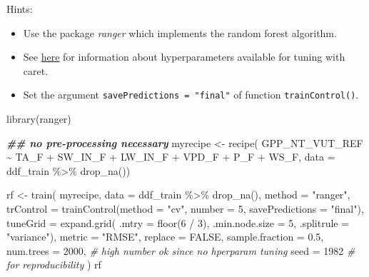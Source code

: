 \documentclass[
]{book}
\newenvironment{Shaded}{\begin{snugshade}}{\end{snugshade}}
\newcommand{\AttributeTok}[1]{\textcolor[rgb]{0.77,0.63,0.00}{#1}}
\newcommand{\CommentTok}[1]{\textcolor[rgb]{0.56,0.35,0.01}{\textit{#1}}}
\newcommand{\ConstantTok}[1]{\textcolor[rgb]{0.00,0.00,0.00}{#1}}
\newcommand{\DecValTok}[1]{\textcolor[rgb]{0.00,0.00,0.81}{#1}}
\newcommand{\DocumentationTok}[1]{\textcolor[rgb]{0.56,0.35,0.01}{\textbf{\textit{#1}}}}
\newcommand{\FloatTok}[1]{\textcolor[rgb]{0.00,0.00,0.81}{#1}}
\newcommand{\FunctionTok}[1]{\textcolor[rgb]{0.00,0.00,0.00}{#1}}
\newcommand{\NormalTok}[1]{#1}
\newcommand{\OtherTok}[1]{\textcolor[rgb]{0.56,0.35,0.01}{#1}}
\newcommand{\SpecialCharTok}[1]{\textcolor[rgb]{0.00,0.00,0.00}{#1}}
\newcommand{\StringTok}[1]{\textcolor[rgb]{0.31,0.60,0.02}{#1}}
\providecommand{\tightlist}{%
  \setlength{\itemsep}{0pt}\setlength{\parskip}{0pt}}
\begin{document}
Hints:

\begin{itemize}
\tightlist
\item
  Use the package \emph{ranger} which implements the random forest algorithm.
\item
  See \href{https://topepo.github.io/caret/available-models.html}{here} for information about hyperparameters available for tuning with caret.
\item
  Set the argument \texttt{savePredictions\ =\ "final"} of function \texttt{trainControl()}.
\end{itemize}

\begin{Shaded}
\begin{Highlighting}[]
\FunctionTok{library}\NormalTok{(ranger)}

\DocumentationTok{\#\# no pre{-}processing necessary}
\NormalTok{myrecipe }\OtherTok{\textless{}{-}} \FunctionTok{recipe}\NormalTok{(}
\NormalTok{  GPP\_NT\_VUT\_REF }\SpecialCharTok{\textasciitilde{}}\NormalTok{ TA\_F }\SpecialCharTok{+}\NormalTok{ SW\_IN\_F }\SpecialCharTok{+}\NormalTok{ LW\_IN\_F }\SpecialCharTok{+}\NormalTok{ VPD\_F }\SpecialCharTok{+}\NormalTok{ P\_F }\SpecialCharTok{+}\NormalTok{ WS\_F, }
  \AttributeTok{data =}\NormalTok{ ddf\_train }\SpecialCharTok{\%\textgreater{}\%} 
    \FunctionTok{drop\_na}\NormalTok{())}

\NormalTok{rf }\OtherTok{\textless{}{-}} \FunctionTok{train}\NormalTok{(}
\NormalTok{  myrecipe, }
  \AttributeTok{data =}\NormalTok{ ddf\_train }\SpecialCharTok{\%\textgreater{}\%} 
    \FunctionTok{drop\_na}\NormalTok{(), }
  \AttributeTok{method =} \StringTok{"ranger"}\NormalTok{,}
  \AttributeTok{trControl =} \FunctionTok{trainControl}\NormalTok{(}\AttributeTok{method =} \StringTok{"cv"}\NormalTok{, }\AttributeTok{number =} \DecValTok{5}\NormalTok{, }\AttributeTok{savePredictions =} \StringTok{"final"}\NormalTok{),}
  \AttributeTok{tuneGrid =} \FunctionTok{expand.grid}\NormalTok{( }\AttributeTok{.mtry =} \FunctionTok{floor}\NormalTok{(}\DecValTok{6} \SpecialCharTok{/} \DecValTok{3}\NormalTok{),}
                          \AttributeTok{.min.node.size =} \DecValTok{5}\NormalTok{,}
                          \AttributeTok{.splitrule =} \StringTok{"variance"}\NormalTok{),}
  \AttributeTok{metric =} \StringTok{"RMSE"}\NormalTok{,}
  \AttributeTok{replace =} \ConstantTok{FALSE}\NormalTok{,}
  \AttributeTok{sample.fraction =} \FloatTok{0.5}\NormalTok{,}
  \AttributeTok{num.trees =} \DecValTok{2000}\NormalTok{,          }\CommentTok{\# high number ok since no hperparam tuning}
  \AttributeTok{seed =} \DecValTok{1982}                \CommentTok{\# for reproducibility}
\NormalTok{)}
\NormalTok{rf}
\end{Highlighting}
\end{Shaded}
\end{document}
